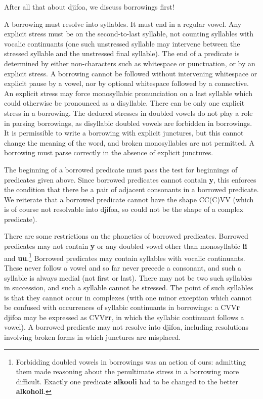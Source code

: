 \documentclass[12pt]{book}
\begin{document}
{After all that about djifoa, we discuss borrowings first!

A borrowing must resolve into syllables.  It must end in a regular vowel.  Any explicit stress must be on the second-to-last syllable, not counting syllables with vocalic continuants (one such unstressed syllable may intervene between the stressed syllable and the unstressed final syllable).     The end of a predicate is determined by either non-characters such as whitespace or punctuation, or by an explicit stress.  A borrowing cannot be followed without intervening whitespace or explicit pause by a vowel, nor by optional whitespace followed by a connective.  An explicit stress  may force monosyllabic pronunciation on a last syllable which could otherwise be pronounced as a disyllable.   There can be only one explicit stress in a borrowing.  The deduced stresses in doubled vowels do not play a role in parsing borrowings, as disyllabic doubled vowels are forbidden in borrowings.  It is permissible to write a borrowing with explicit junctures, but this cannot change the meaning of the word, and broken monosyllables are not permitted.  A borrowing must parse correctly in the absence of explicit junctures.

The beginning of a borrowed predicate must pass the test for beginnings of predicates given above.  Since borrowed predicates cannot contain {\bf y}, this enforces the condition that there be a pair of adjacent consonants in a borrowed predicate.  We reiterate that a borrowed predicate cannot have the shape CC(C)VV (which is of course not resolvable into djifoa, so could not be the shape of a complex predicate).

There are some restrictions on the phonetics of borrowed predicates.  Borrowed predicates may not contain {\bf y} or any doubled vowel other than monosyllabic {\bf ii} and {\bf uu}.\footnote{Forbidding doubled vowels in borrowings was an action of ours:  admitting them made reasoning about the penultimate stress in a borrowing more difficult.  Exactly one predicate {\bf alkooli} had to be changed to the better {\bf alkoholi}.}
Borrowed predicates may contain syllables with vocalic continuants.  These never follow a vowel and so far never precede a consonant, and such a syllable is always medial (not first or last).  There may not be two such syllables in succession, and such a syllable cannot be stressed. The point of such syllables is that they cannot occur in complexes (with one minor exception which cannot be confused with occurrences of syllabic continuants in borrowings:  a CVV{\bf r} djifoa may be expressed as CVV{\bf rr}, in which the syllabic continuant follows a vowel).  A borrowed predicate may not resolve into djifoa, including resolutions involving broken forms in which junctures are misplaced.

}
\end{document}
